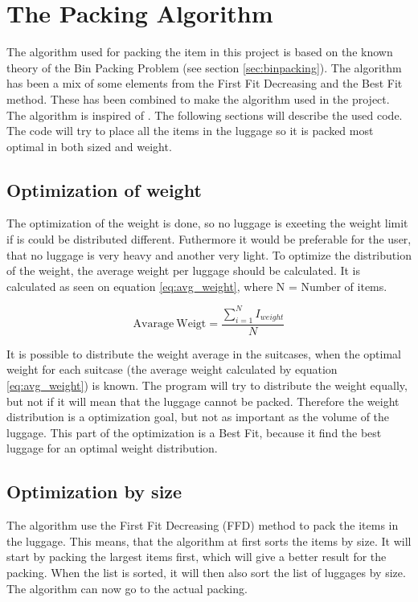 \section{The Packing Algorithm}
\label{sec:algorithm}
The algorithm used for packing the item in this project is based on the known theory of the Bin Packing Problem (see section \ref{sec:binpacking}). The algorithm has been a mix of some elements from the First Fit Decreasing and the Best Fit method. These has been combined to make the algorithm used in the project. The algorithm is inspired of \citet{three-dim-pack}. The following sections will describe the used code.
The code will try to place all the items in the luggage so it is packed most optimal in both sized and weight.

\subsection{Optimization of weight}
The optimization of the weight is done, so no luggage is exeeting the weight limit if is could be distributed different. Futhermore it would be preferable for the user, that no luggage is very heavy and another very light.
To optimize the distribution of the weight, the average weight per luggage should be calculated. It is calculated as seen on equation \ref{eq:avg_weight}, where N = Number of items.

\begin{equation}
	\label{eq:avg_weight}
	\mathrm{Avarage~Weigt} = \frac{\displaystyle\sum_{i=1}^{N} I_{weight}}{N}
\end{equation}

It is possible to distribute the weight average in the suitcases, when the optimal weight for each suitcase (the average weight calculated by equation \ref{eq:avg_weight}) is known. The program will try to distribute the weight equally, but not if it will mean that the luggage cannot be packed. Therefore the weight distribution is a optimization goal, but not as important as the volume of the luggage. This part of the optimization is a Best Fit, because it find the best luggage for an optimal weight distribution.

\subsection{Optimization by size}
The algorithm use the First Fit Decreasing (FFD) method to pack the items in the luggage. This means, that the algorithm at first sorts the items by size. It will start by packing the largest items first, which will give a better result for the packing. When the list is sorted, it will then also sort the list of luggages by size. The algorithm can now go to the actual packing. 

